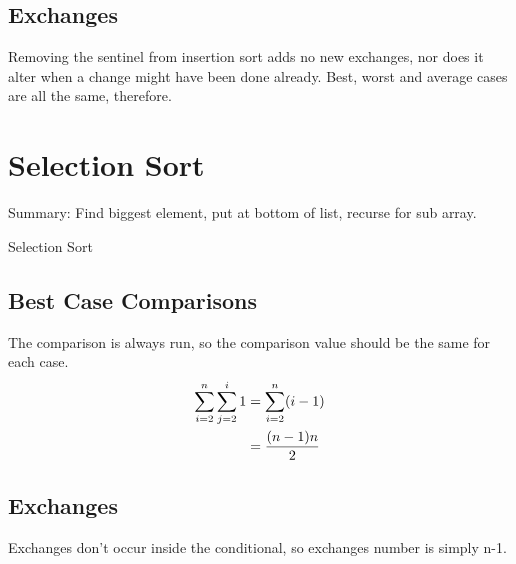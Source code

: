 \documentclass[english, 10pt]{article}
\begin{document}
\subsection{Exchanges}
Removing the sentinel from insertion sort adds no new exchanges, nor does it alter when a change might have been done already.
Best, worst and average cases are all the same, therefore.



\section{Selection Sort}
Summary: Find biggest element, put at bottom of list, recurse for sub array.

\begin{algorithm}[H]
    \caption{Selection Sort}
\end{algorithm}

\subsection{Best Case Comparisons}
The comparison is always run, so the comparison value should be the same for each case.
\begin{align*}
    \sum_{i=2}^{n}\sum_{j=2}^{i}1 &= \sum_{i=2}^{n} (i-1) \\
    & = \frac{(n-1)n}{2}\\
\end{align*}

\subsection{Exchanges}
Exchanges don't occur inside the conditional, so exchanges number is simply n-1.
\end{document}
